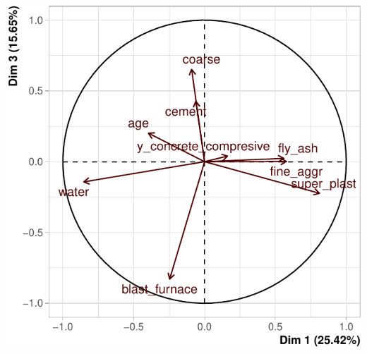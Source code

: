 \documentclass[
  12pt,
]{article}
\begin{document}
\begin{center}\includegraphics{rmd_final_files/figure-latex/unnamed-chunk-26-1} \end{center}
\end{document}
